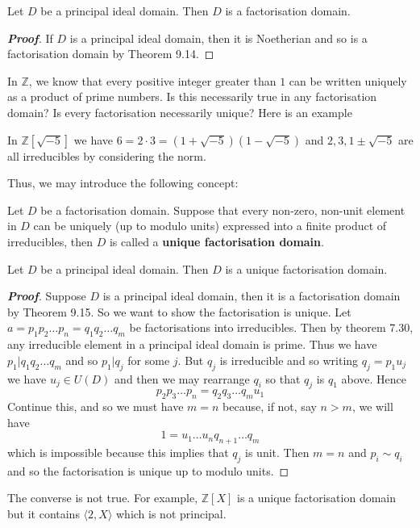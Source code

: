 \begin{theorem} Let $D$ be a principal ideal domain. Then $D$ is a factorisation domain.
\end{theorem}
\begin{proof}[\bf Proof] If $D$ is a principal ideal domain, then it is Noetherian and so is a factorisation domain by Theorem 9.14.
\end{proof}
In $\mathbb{Z}$, we know that every positive integer greater than $1$ can be written uniquely as a product of prime numbers. Is this necessarily true in any factorisation domain? Is every factorisation necessarily unique? Here is an example
\begin{example} In $\mathbb{Z}[\sqrt{-5}]$ we have $6=2\cdot3=(1+\sqrt{-5})(1-\sqrt{-5})$ and
$2,3,1 \pm \sqrt{-5}$ are all irreducibles by considering the norm.
\end{example}
Thus, we may introduce the following concept:
\begin{definition} Let $D$ be a factorisation domain. Suppose that every non-zero, non-unit element in $D$ can be uniquely (up to modulo units) expressed into a finite product of irreducibles, then $D$ is called a
{\bf unique factorisation domain}.
\end{definition}
\begin{theorem} Let $D$ be a principal ideal domain. Then $D$ is a unique factorisation domain.
\end{theorem}
\begin{proof}[\bf Proof] Suppose $D$ is a principal ideal domain, then it is a factorisation domain by Theorem 9.15. So we want to show the factorisation is unique. Let $a=p_1 p_2\ldots p_n =q_1q_2\ldots q_m$ be factorisations into irreducibles. Then by theorem 7.30, any irreducible element in a principal ideal domain is prime. Thus we have $p_1 |q_1q_2\ldots q_m$ and so $p_1 | q_j$ for some $j$.
But $q_j$ is irreducible and so writing $q_j=p_1 u_j$ we have $u_j \in U(D)$ and then we may rearrange $q_i$ so that $q_j$ is $q_1$ above. Hence
$$p_2p_3\ldots p_n=q_2q_3\ldots q_m u_1$$
Continue this, and so we must have $m=n$ because, if not, say $n>m$, we will have
$$1=u_1\ldots u_n q_{n+1}\ldots q_m$$ which is impossible because this implies that $q_j$ is unit.
Then $m=n$ and $p_i \sim q_i$ and so the factorisation is unique up to modulo units.
\end{proof}
\begin{remark} The converse is not true. For example, $\mathbb{Z}[X]$ is a unique factorisation domain but it contains $\langle 2,X \rangle$ which is not principal.
\end{remark}
